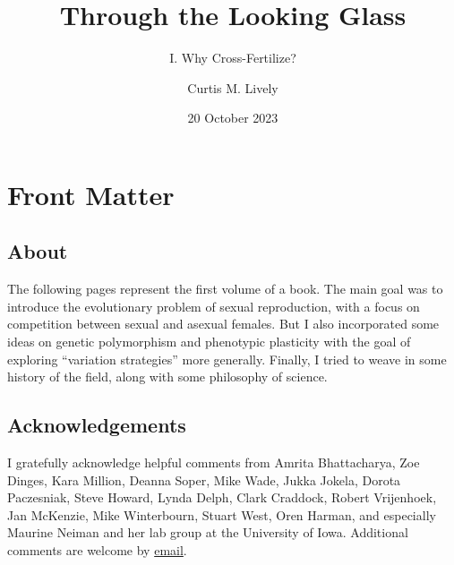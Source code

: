 \documentclass[
  letterpaper,
]{book}
\title{Through the Looking Glass}
\subtitle{I. Why Cross-Fertilize?}
\author{Curtis M. Lively}
\date{20 October 2023}
\renewcommand*\contentsname{Table of contents}
\newcommand\contentsname{Table of contents}
\begin{document}
\frontmatter
\maketitle
\ifdefined\Shaded\renewenvironment{Shaded}{\begin{tcolorbox}[borderline west={3pt}{0pt}{shadecolor}, sharp corners, breakable, frame hidden, enhanced, interior hidden, boxrule=0pt]}{\end{tcolorbox}}\fi

\renewcommand*\contentsname{Contents}
{
\hypersetup{linkcolor=}
\setcounter{tocdepth}{2}
\tableofcontents
}
\listoffigures
\listoftables
\mainmatter
{}

\hypertarget{front-matter}{%
\chapter*{Front Matter}\label{front-matter}}


\hypertarget{about}{%
\section*{About}\label{about}}


The following pages represent the first volume of a book. The main goal
was to introduce the evolutionary problem of sexual reproduction, with a
focus on competition between sexual and asexual females. But I also
incorporated some ideas on genetic polymorphism and phenotypic
plasticity with the goal of exploring ``variation strategies'' more
generally. Finally, I tried to weave in some history of the field, along
with some philosophy of science.

\hypertarget{acknowledgements}{%
\section*{Acknowledgements}\label{acknowledgements}}


I gratefully acknowledge helpful comments from Amrita Bhattacharya, Zoe
Dinges, Kara Million, Deanna Soper, Mike Wade, Jukka Jokela, Dorota
Paczesniak, Steve Howard, Lynda Delph, Clark Craddock, Robert
Vrijenhoek, Jan McKenzie, Mike Winterbourn, Stuart West, Oren Harman,
and especially Maurine Neiman and her lab group at the University of
Iowa. Additional comments are welcome by
\href{mailto:clively@indiana.edu}{email}.
\end{document}
